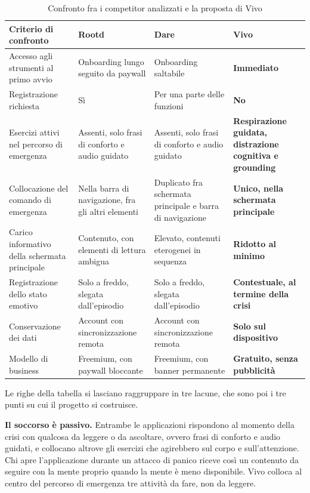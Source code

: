 \begin{table}[htbp]
    \centering
    \small
    \renewcommand{\arraystretch}{1.3}
    \begin{tabularx}{\textwidth}{L{3.1cm} X X X}
        \toprule
        \textbf{Criterio di confronto} & \textbf{Rootd} & \textbf{Dare} & \textbf{Vivo} \\
        \midrule
        Accesso agli strumenti al primo avvio & Onboarding lungo seguito da paywall & Onboarding saltabile & \textbf{Immediato} \\
        Registrazione richiesta & Sì & Per una parte delle funzioni & \textbf{No} \\
        Esercizi attivi nel percorso di emergenza & Assenti, solo frasi di conforto e audio guidato & Assenti, solo frasi di conforto e audio guidato & \textbf{Respirazione guidata, distrazione cognitiva e grounding} \\
        Collocazione del comando di emergenza & Nella barra di navigazione, fra gli altri elementi & Duplicato fra schermata principale e barra di navigazione & \textbf{Unico, nella schermata principale} \\
        Carico informativo della schermata principale & Contenuto, con elementi di lettura ambigua & Elevato, contenuti eterogenei in sequenza & \textbf{Ridotto al minimo} \\
        Registrazione dello stato emotivo & Solo a freddo, slegata dall'episodio & Solo a freddo, slegata dall'episodio & \textbf{Contestuale, al termine della crisi} \\
        Conservazione dei dati & Account con sincronizzazione remota & Account con sincronizzazione remota & \textbf{Solo sul dispositivo} \\
        Modello di business & Freemium, con paywall bloccante & Freemium, con banner permanente & \textbf{Gratuito, senza pubblicità} \\
        \bottomrule
    \end{tabularx}
    \caption{Confronto fra i competitor analizzati e la proposta di Vivo}
    \label{tab:competitor}
\end{table}

Le righe della tabella si lasciano raggruppare in tre lacune, che sono poi i tre punti su cui il progetto si costruisce.

\textbf{Il soccorso è passivo.}
Entrambe le applicazioni rispondono al momento della crisi con qualcosa da leggere o da ascoltare, ovvero frasi di conforto e audio guidati, e collocano altrove gli esercizi che agirebbero sul corpo e sull'attenzione.
Chi apre l'applicazione durante un attacco di panico riceve così un contenuto da seguire con la mente proprio quando la mente è meno disponibile.
Vivo colloca al centro del percorso di emergenza tre attività da fare, non da leggere.

